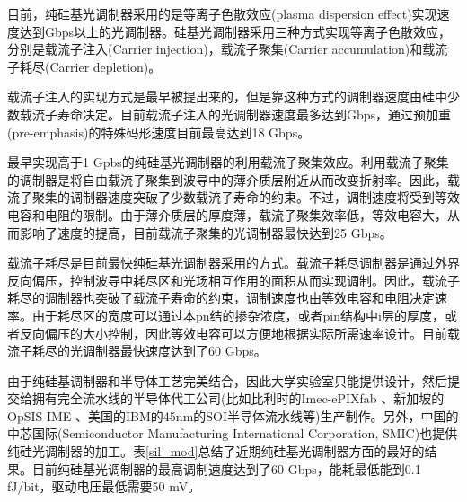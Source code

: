 目前，纯硅基光调制器采用的是等离子色散效应(plasma dispersion effect)实现速度达到Gbps以上的光调制器。硅基光调制器采用三种方式实现等离子色散效应，分别是载流子注入(Carrier injection)，载流子聚集(Carrier accumulation)和载流子耗尽(Carrier depletion)。

载流子注入的实现方式是最早被提出来的，但是靠这种方式的调制器速度由硅中少数载流子寿命决定。目前载流子注入的光调制器速度最多达到Gbps，通过预加重(pre-emphasis)的特殊码形速度目前最高达到18 Gbps\cite{manipatruni2007high}。

最早实现高于1 Gpbs的纯硅基光调制器的利用载流子聚集效应。利用载流子聚集的调制器是将自由载流子聚集到波导中的薄介质层附近从而改变折射率。因此，载流子聚集的调制器速度突破了少数载流子寿命的约束。不过，调制速度将受到等效电容和电阻的限制。由于薄介质层的厚度薄，载流子聚集效率低，等效电容大，从而影响了速度的提高，目前载流子聚集的光调制器最快达到25 Gbps\cite{fujikata201025}。

载流子耗尽是目前最快纯硅基光调制器采用的方式。载流子耗尽调制器是通过外界反向偏压，控制波导中耗尽区和光场相互作用的面积从而实现调制。因此，载流子耗尽的调制器也突破了载流子寿命的约束，调制速度也由等效电容和电阻决定速率。由于耗尽区的宽度可以通过本pn结的掺杂浓度，或者pin结构中i层的厚度，或者反向偏压的大小控制，因此等效电容可以方便地根据实际所需速率设计。目前载流子耗尽的光调制器最快速度达到了60 Gbps\cite{Xiao201360}。

由于纯硅基调制器和半导体工艺完美结合，因此大学实验室只能提供设计，然后提交给拥有完全流水线的半导体代工公司(比如比利时的Imec-ePIXfab \cite{Imec, absil2015silicon}、新加坡的OpSIS-IME \cite{novack201330}、美国的IBM的45nm的SOI半导体流水线\cite{narasimha2006high}等)生产制作。另外，中国的中芯国际(Semiconductor Manufacturing International Corporation, SMIC)也提供纯硅光调制器的加工\cite{xu2012high,xiao2013high,Xiao201360}。表\ref{sil_mod}总结了近期纯硅基光调制器方面的最好的结果。目前纯硅基光调制器的最高调制速度达到了60 Gbps，能耗最低能到0.1 fJ/bit，驱动电压最低需要50 mV。

